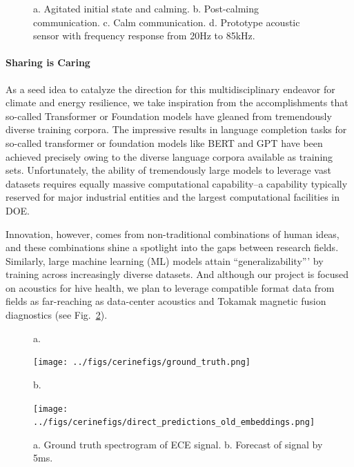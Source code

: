 \begin{figure}
{		}
	\vspace{-1\baselineskip}
	\caption{\label{fig::bees}
		a. Agitated initial state and calming.
		b. Post-calming communication.
		c. Calm communication.
		d. Prototype acoustic sensor with frequency response from 20Hz to 85kHz.
		}
\end{figure}



\paragraph{Sharing is Caring}
As a seed idea to catalyze the direction for this multidisciplinary endeavor for climate and energy resilience, we take inspiration from the accomplishments that so-called Transformer \cite{Attention2017} or Foundation \cite{StanfordFoundationPaper} models have gleaned from tremendously diverse training corpora.
The impressive results in language completion tasks for so-called transformer or foundation models like BERT \cite{bert} and GPT \cite{GPT2018} have been achieved precisely owing to the diverse language corpora available as training sets. 
Unfortunately, the ability of tremendously large models to leverage vast datasets requires equally massive computational capability--a capability typically reserved for major industrial entities and the largest computational facilities in DOE. 

Innovation, however, comes from non-traditional combinations of human ideas, and these combinations shine a spotlight into the gaps between research fields. 
Similarly, large machine learning (ML) models attain “generalizability”' by training across increasingly diverse datasets. 
And although our project is focused on acoustics for hive health, we plan to leverage compatible format data from fields as far-reaching as data-center acoustics and Tokamak magnetic fusion diagnostics (see Fig.~\ref{fig::spectrograms}).

\begin{figure}
	\raggedright{a.}\\
	\centerline{\texttt{[image: ../figs/cerinefigs/ground\_truth.png]}}
	\raggedright{b.}\\
	\centerline{\texttt{[image: ../figs/cerinefigs/direct\_predictions\_old\_embeddings.png]}}
	\caption{\label{fig::spectrograms}
		a. Ground truth spectrogram of ECE signal. b. Forecast of signal by 5ms.}
\end{figure}

